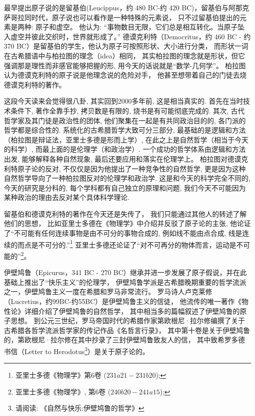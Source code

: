 最早提出原子说的是留基伯(Leucippus，约 480 BC-约 420
BC)，留基伯与阿那克萨哥拉同时代，原子说也可以看作是一种特殊的元素说，
只不过留基伯提出的元素是两种: 原子和虚空。 他认为:
“事物数目无限，它们总是相互转化。当原子坠入虚空并彼此交织时，世界就形成了。”
德谟克利特（Democritus，约 460 BC - 约 370
BC）是留基伯的学生，他认为原子可按照形状、大小进行分类，
而形状一词在古希腊语中与柏拉图的理念（idea）相同，
其实柏拉图的理念就是形状，但它强调那是理性而非感官能够把握的形,
用今天的话说就是“数学-几何学”。
柏拉图认为德谟克利特的原子说是他理念说的危险对手，
他甚至想带着自己的门徒去烧德谟克利特的著作。

这段今天读来会觉得很八卦, 其实回到2000多年前, 这是相当真实的.
首先在当时技术条件下, 著作全靠手抄, 拷贝数是有限的,
烧书是有可能彻底完成的. 其次, 古代哲学家及其门徒是政治性的团体,
他们聚集在一起是有共同政治目的的, 各门派的哲学都是综合性的.
系统化的古希腊哲学大致可分三部分,
最基础的是逻辑和方法（柏拉图是辩证法，亚里士多德是形而上学）,
在此之上是自然哲学（相当于今天的科学）,
而最上面的是伦理学（和政治学）. 一个成功的哲学体系由逻辑和方法出发,
能够解释各种自然现象, 最后还要应用和落实在伦理学上。
柏拉图对德谟克利特原子论的反对,
不仅仅是因为他提出了一种竞争性的自然哲学,
更是因为这种自然哲学导向了一种柏拉图反对的伦理学和政治学.
这是和今天的科学完全不同的, 今天的研究是分科的,
每个学科都有自己独立的原理和问题,
我们今天不可能因为某种政治的理由去反对某个具体科学理论.


留基伯和德谟克利特的著作在今天还是失传了，
我们只能通过其他人的转述了解他们的思想，
比如亚里士多德在《物理学》中介绍并反驳了原子论的主张,
他论证了“不可能有任何连续事物是由不可分的事物合成的,
例如线不能由点合成, 线是连续的而点是不可分的.”\footnote{亚里士多德《物理学》第6卷
($231a21-231b20$);} 亚里士多德还论证了“对不可再分的物体而言，运动是不可能的”\footnote{亚里士多德《物理学》, 第6卷
($240b20-241a15$);}。


伊壁鸠鲁（Epicurus，341 BC - 270
BC）继承并进一步发展了原子假说，并在此基础上推出了“快乐主义”的伦理学，
伊壁鸠鲁学派是古希腊晚期重要的哲学流派之一，伊壁鸠鲁主义一度在希腊和罗马非常流行。
罗马诗人卢克莱修（Lucretius，约99BC-约55BC）是伊壁鸠鲁主义的信徒，
他流传的唯一著作《物性论》详细介绍了伊壁鸠鲁的自然哲学，
其中相当多的篇幅叙述了伊壁鸠鲁的原子思想。
到公元三世纪，罗马帝国时代的希腊作家第欧根尼·拉尔修编撰了关于古希腊各哲学流派哲学家的传记作品《名哲言行录》，
其中第十卷是关于伊壁鸠鲁的，第欧根尼·拉尔修在其中抄录了三封伊壁鸠鲁致友人的信，
其中致希罗多德书信（Letter to Herodotus\footnote{请阅读:
《自然与快乐:伊壁鸠鲁的哲学》 }）是关于原子论的。


